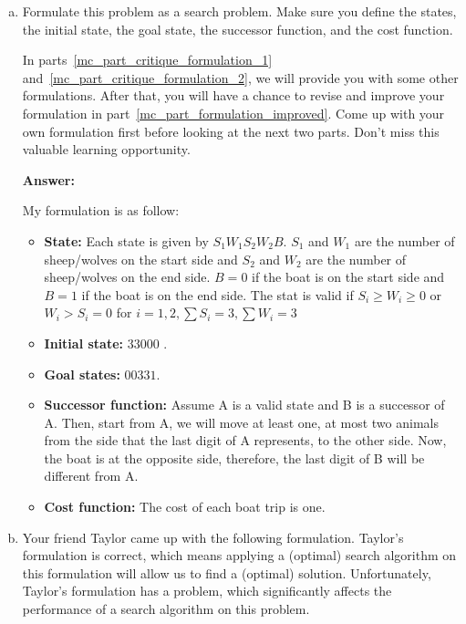 \documentclass[12pt]{article}
\begin{document}
\begin{enumerate}[(a)]

\item
\label{mc_part_formulation}
Formulate this problem as a search problem. Make sure you define the states, the initial state, the goal state, the successor function, and the cost function.

In parts~\ref{mc_part_critique_formulation_1} and~\ref{mc_part_critique_formulation_2}, we will provide you with some other formulations. After that, you will have a chance to revise and improve your formulation in part~\ref{mc_part_formulation_improved}. Come up with your own formulation first before looking at the next two parts. Don't miss this valuable learning opportunity.

{\bf Answer:}

My formulation is as follow:

\begin{itemize}
\item
{\bf State:} Each state is given by $S_1 W_1 S_2 W_2 B$. $S_1$ and $W_1$ are the number of sheep/wolves on the start side and $S_2$ and $W_2$ are the number of sheep/wolves on the end side. $B = 0$ if the boat is on the start side and $B = 1$ if the boat is on the end side. The stat is valid if $S_i \geq W_i \geq 0$ or $W_i > S_i = 0$ for $i = 1, 2, \sum{S_i} = 3, \sum{W_i} = 3$

\item
{\bf Initial state:} $33000$ .

\item
{\bf Goal states:} $00331$.

\item
{\bf Successor function:} Assume A is a valid state and B is a successor of A. Then, start from A, we will move at least one, at most two animals from the side that the last digit of A represents, to the other side. Now, the boat is at the opposite side, therefore, the last digit of B will be different from A.

\item
{\bf Cost function:} The cost of each boat trip is one.
\end{itemize}



\item
\label{mc_part_critique_formulation_1}
Your friend Taylor came up with the following formulation. Taylor's formulation is correct, which means applying a (optimal) search algorithm on this formulation will allow us to find a (optimal) solution. Unfortunately, Taylor's formulation has a problem, which significantly affects the performance of a search algorithm on this problem. 


\end{enumerate}
\end{document}
